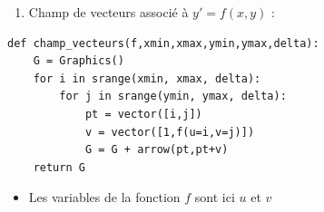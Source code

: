 \begin{frame}
\begin{center}
\end{center}

\end{frame}


\begin{frame}[fragile]

\begin{enumerate}
  \item Champ de vecteurs associé à $y' = f(x,y)$ :
   
\end{enumerate}
 
\begin{algo}
\begin{lstlisting}
def champ_vecteurs(f,xmin,xmax,ymin,ymax,delta):
    G = Graphics()  
    for i in srange(xmin, xmax, delta):
        for j in srange(ymin, ymax, delta):
            pt = vector([i,j])
            v = vector([1,f(u=i,v=j)])                 
            G = G + arrow(pt,pt+v)
    return G
\end{lstlisting}
\end{algo}  
\pause
  \begin{itemize}
    \item Les variables de la fonction $f$ sont ici $u$ et $v$
  \end{itemize}

\end{frame}



